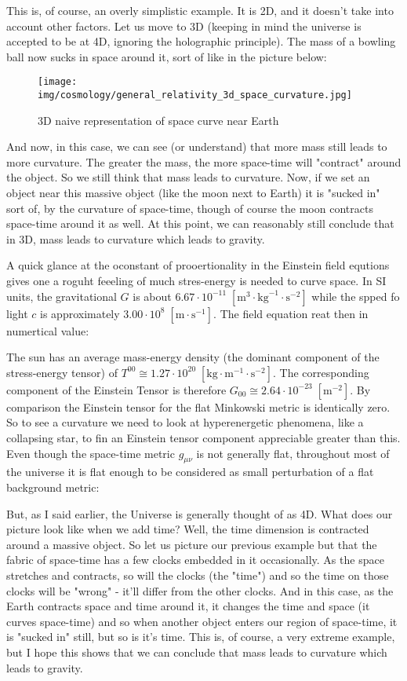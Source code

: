 	This is, of course, an overly simplistic example. It is 2D, and it doesn't take into account other factors. Let us move to 3D (keeping in mind the universe is accepted to be at 4D, ignoring the holographic principle). The mass of a bowling ball now sucks in space around it, sort of like in the picture below:
	\begin{figure}[H]
		\centering
		\texttt{[image: img/cosmology/general\_relativity\_3d\_space\_curvature.jpg]}	
		\caption{3D naive representation of space curve near Earth}
	\end{figure}
	And now, in this case, we can see (or understand) that more mass still leads to more curvature. The greater the mass, the more space-time will "contract" around the object. So we still think that mass leads to curvature. Now, if we set an object near this massive object (like the moon next to Earth) it is "sucked in" sort of, by the curvature of space-time, though of course the moon contracts space-time around it as well. At this point, we can reasonably still conclude that in 3D, mass leads to curvature which leads to gravity.
	
	A quick glance at the oconstant of prooertionality in the Einstein field equtions gives one a roguht feeeling of much stres-energy is needed to curve space. In SI units, the gravitational $G$ is about $6.67\cdot 10^{-11}\;[\text{m}^3\cdot\text{kg}^{-1}\cdot\text{s}^{-2}]$ while the spped fo light $c$ is approximately $3.00\cdot 10^8\;[\text{m}\cdot \text{s}^{-1}]$. The field equation reat then in numertical value:
	
	The sun has an average mass-energy density (the dominant component of the stress-energy tensor) of $T^{00}\cong 1.27\cdot 10^{20}\;[\text{kg}\cdot\text{m}^{-1}\cdot\text{s}^{-2}]$. The corresponding component of the Einstein Tensor is therefore $G_{00}\cong 2.64\cdot 10^{-23}\;[\text{m}^{-2}]$. By comparison the Einstein tensor for the flat Minkowski metric is identically zero. So to see a curvature we need to look at hyperenergetic phenomena, like a collapsing star, to fin an Einstein tensor component appreciable greater than this. Even though the space-time metric $g_{\mu\nu}$ is not generally flat, throughout most of the universe it is flat enough to be considered as small perturbation of a flat background metric:
	
	But, as I said earlier, the Universe is generally thought of as 4D. What does our picture look like when we add time? Well, the time dimension is contracted around a massive object. So let us picture our previous example but that the fabric of space-time has a few clocks embedded in it occasionally. As the space stretches and contracts, so will the clocks (the "time") and so the time on those clocks will be "wrong" - it'll differ from the other clocks. And in this case, as the Earth contracts space and time around it, it changes the time and space (it curves space-time) and so when another object enters our region of space-time, it is "sucked in" still, but so is it's time. This is, of course, a very extreme example, but I hope this shows that we can conclude that mass leads to curvature which leads to gravity. 
	
